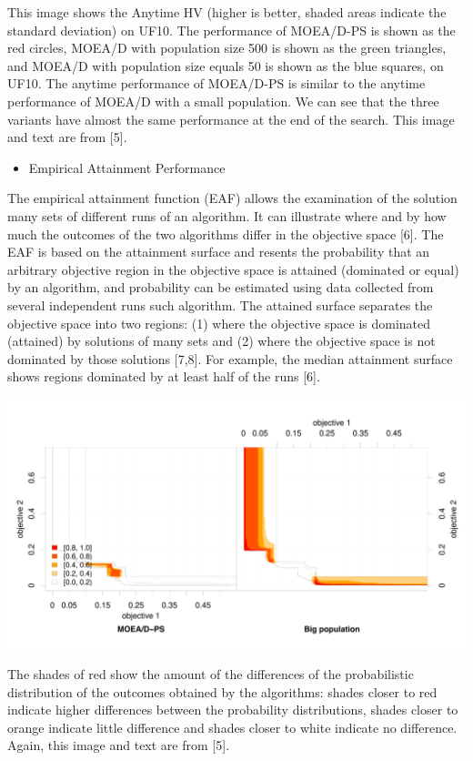 \documentclass[
]{article}
\providecommand{\tightlist}{%
  \setlength{\itemsep}{0pt}\setlength{\parskip}{0pt}}
\begin{document}
This image shows the Anytime HV (higher is better, shaded areas indicate
the standard deviation) on UF10. The performance of MOEA/D-PS is shown
as the red circles, MOEA/D with population size 500 is shown as the
green triangles, and MOEA/D with population size equals 50 is shown as
the blue squares, on UF10. The anytime performance of MOEA/D-PS is
similar to the anytime performance of MOEA/D with a small population. We
can see that the three variants have almost the same performance at the
end of the search. This image and text are from {[}5{]}.

\begin{itemize}
\tightlist
\item
  Empirical Attainment Performance
\end{itemize}

The empirical attainment function (EAF) allows the examination of the
solution many sets of different runs of an algorithm. It can illustrate
where and by how much the outcomes of the two algorithms differ in the
objective space {[}6{]}. The EAF is based on the attainment surface and
resents the probability that an arbitrary objective region in the
objective space is attained (dominated or equal) by an algorithm, and
probability can be estimated using data collected from several
independent runs such algorithm. The attained surface separates the
objective space into two regions: (1) where the objective space is
dominated (attained) by solutions of many sets and (2) where the
objective space is not dominated by those solutions {[}7,8{]}. For
example, the median attainment surface shows regions dominated by at
least half of the runs {[}6{]}.

\begin{center}\includegraphics[width=0.65\linewidth]{imgs/eaf_UF6_big_vs_ps} \end{center}

The shades of red show the amount of the differences of the
probabilistic distribution of the outcomes obtained by the algorithms:
shades closer to red indicate higher differences between the probability
distributions, shades closer to orange indicate little difference and
shades closer to white indicate no difference. Again, this image and
text are from {[}5{]}.
\end{document}

